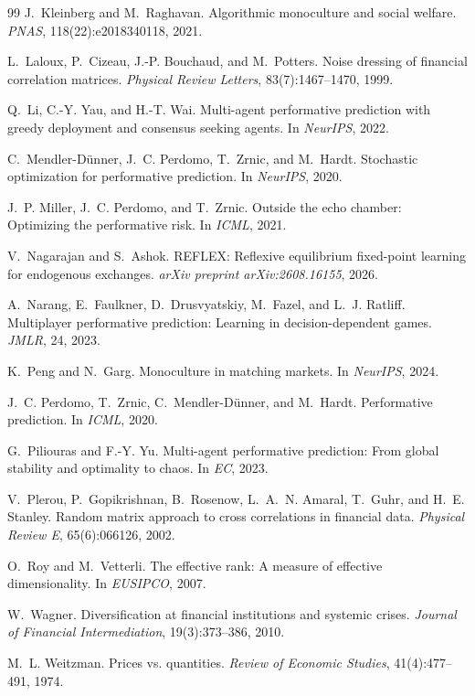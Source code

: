 \documentclass{article}
\theoremstyle{plain}
\theoremstyle{definition}
\begin{document}
\begin{thebibliography}{99}
 J.~Kleinberg and M.~Raghavan. Algorithmic monoculture and social welfare. \emph{PNAS}, 118(22):e2018340118, 2021.

 L.~Laloux, P.~Cizeau, J.-P. Bouchaud, and M.~Potters. Noise dressing of financial correlation matrices. \emph{Physical Review Letters}, 83(7):1467--1470, 1999.

 Q.~Li, C.-Y. Yau, and H.-T. Wai. Multi-agent performative prediction with greedy deployment and consensus seeking agents. In \emph{NeurIPS}, 2022.

 C.~Mendler-D\"unner, J.~C. Perdomo, T.~Zrnic, and M.~Hardt. Stochastic optimization for performative prediction. In \emph{NeurIPS}, 2020.

 J.~P. Miller, J.~C. Perdomo, and T.~Zrnic. Outside the echo chamber: Optimizing the performative risk. In \emph{ICML}, 2021.

 V.~Nagarajan and S.~Ashok. REFLEX: Reflexive equilibrium fixed-point learning for endogenous exchanges. \emph{arXiv preprint arXiv:2608.16155}, 2026.

 A.~Narang, E.~Faulkner, D.~Drusvyatskiy, M.~Fazel, and L.~J. Ratliff. Multiplayer performative prediction: Learning in decision-dependent games. \emph{JMLR}, 24, 2023.

 K.~Peng and N.~Garg. Monoculture in matching markets. In \emph{NeurIPS}, 2024.

 J.~C. Perdomo, T.~Zrnic, C.~Mendler-D\"unner, and M.~Hardt. Performative prediction. In \emph{ICML}, 2020.

 G.~Piliouras and F.-Y. Yu. Multi-agent performative prediction: From global stability and optimality to chaos. In \emph{EC}, 2023.

 V.~Plerou, P.~Gopikrishnan, B.~Rosenow, L.~A.~N. Amaral, T.~Guhr, and H.~E. Stanley. Random matrix approach to cross correlations in financial data. \emph{Physical Review E}, 65(6):066126, 2002.

 O.~Roy and M.~Vetterli. The effective rank: A measure of effective dimensionality. In \emph{EUSIPCO}, 2007.

 W.~Wagner. Diversification at financial institutions and systemic crises. \emph{Journal of Financial Intermediation}, 19(3):373--386, 2010.

 M.~L. Weitzman. Prices vs. quantities. \emph{Review of Economic Studies}, 41(4):477--491, 1974.

\end{thebibliography}

\appendix



\newpage

\end{document}
